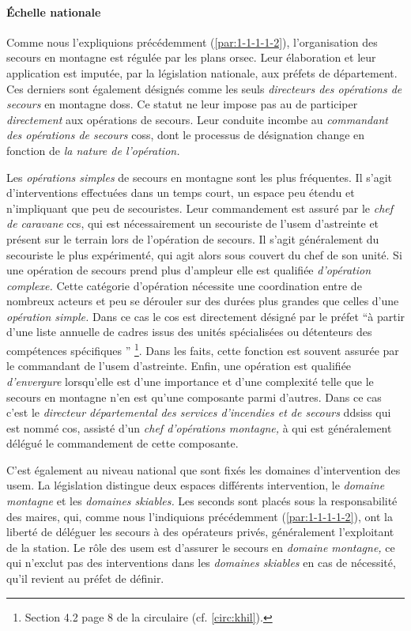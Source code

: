 \paragraph{Échelle nationale}

Comme nous l'expliquions précédemment (\ref{par:1-1-1-1-2}),
l'organisation des secours en montagne est régulée par les plans
\ac{orsec}. Leur élaboration et leur application est imputée, par la
législation nationale, aux préfets de département. Ces derniers sont
également désignés comme les seuls \emph{directeurs des opérations de
  secours} en montagne \acp{dos}. Ce statut ne leur impose pas au de
participer \emph{directement} aux opérations de secours. Leur conduite
incombe au \emph{commandant des opérations de secours} \acp{cos}, dont
le processus de désignation change en fonction de \emph{la nature de
  l'opération.}

Les \emph{opérations simples} de secours en montagne sont les plus
fréquentes. Il s'agit d'interventions effectuées dans un temps court,
un espace peu étendu et n'impliquant que peu de secouristes. Leur
commandement est assuré par le \emph{chef de caravane} \acp{cc}, qui
est nécessairement un secouriste de l'\ac{usem} d'astreinte et présent
sur le terrain lors de l'opération de secours. Il s'agit généralement
du secouriste le plus expérimenté, qui agit alors sous couvert du chef
de son unité. Si une opération de secours prend plus d'ampleur elle
est qualifiée \emph{d'opération complexe.}  Cette catégorie
d'opération nécessite une coordination entre de nombreux acteurs et
peu se dérouler sur des durées plus grandes que celles d'une
\emph{opération simple.} Dans ce cas le \ac{cos} est directement
désigné par le préfet \enquote{à partir d’une liste annuelle de cadres
  issus des unités spécialisées ou détenteurs des compétences
  spécifiques \textelp{}} \footnote{Section 4.2 page 8 de la
  circulaire  (cf. \autoref{circ:khil}).}. Dans les faits,
cette fonction est souvent assurée par le commandant de l'\ac{usem}
d'astreinte. Enfin, une opération est qualifiée \emph{d'envergure}
lorsqu'elle est d'une importance et d'une complexité telle que le
secours en montagne n'en est qu'une composante parmi d'autres. Dans ce
cas c'est le \emph{directeur départemental des services d'incendies et
  de secours} \acp{ddsis} qui est nommé \ac{cos}, assisté d'un
\emph{chef d'opérations montagne,} à qui est généralement délégué le
commandement de cette composante.

C'est également au niveau national que sont fixés les domaines
d'intervention des \ac{usem}. La législation distingue deux espaces
différents intervention, le \emph{domaine montagne} et les
\emph{domaines skiables.} Les seconds sont placés sous la
responsabilité des maires, qui, comme nous l'indiquions précédemment
(\ref{par:1-1-1-1-2}), ont la liberté de déléguer les secours à des
opérateurs privés, généralement l'exploitant de la station. Le rôle
des \ac{usem} est d'assurer le secours en \emph{domaine montagne,} ce
qui n’exclut pas des interventions dans les \emph{domaines skiables} en
cas de nécessité, qu'il revient au préfet de définir.

